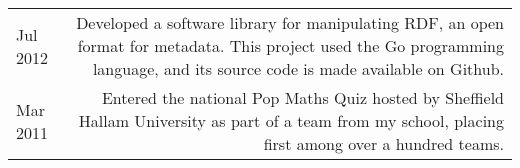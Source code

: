 \begin{longtable}{L!{\sep}R}
    Jul 2012 & Developed a software library for manipulating RDF, an open format for metadata. This project used the Go programming language, and its source code is made available on Github. \vspace{1.2em} \\

    Mar 2011 & Entered the national Pop Maths Quiz hosted by Sheffield Hallam University as part of a team from my school, placing first among over a hundred teams. \\
\end{longtable}
